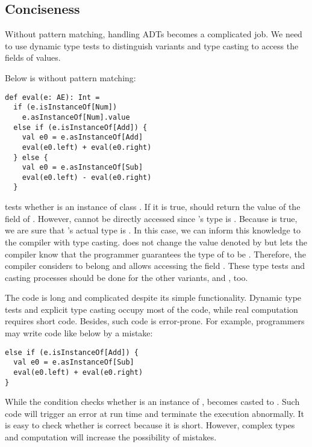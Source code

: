 \subsection{Conciseness}

Without pattern matching, handling ADTs becomes a complicated job. We need to
use dynamic type tests to distinguish variants and type casting to access the
fields of values.

Below is  without pattern matching:

\begin{verbatim}
def eval(e: AE): Int =
  if (e.isInstanceOf[Num])
    e.asInstanceOf[Num].value
  else if (e.isInstanceOf[Add]) {
    val e0 = e.asInstanceOf[Add]
    eval(e0.left) + eval(e0.right)
  } else {
    val e0 = e.asInstanceOf[Sub]
    eval(e0.left) - eval(e0.right)
  }
\end{verbatim}

 tests whether  is an instance of class
. If it is true,  should return the value of the field
 of . However,  cannot be directly accessed
since 's type is . Because  is true,
we are sure that 's actual type is . In this case, we can
inform this knowledge to the compiler with type casting. 
does not change the value denoted by  but lets the compiler know that
the programmer guarantees the type of  to be . Therefore, the
compiler considers  to belong  and allows
accessing the field . These type tests and casting processes should
be done for the other variants,  and , too.

The code is long and complicated despite its simple functionality. Dynamic type
tests and explicit type casting occupy most of the code, while real
computation requires short code. Besides, such code is error-prone.
For example, programmers may write code like below by a mistake:

\begin{verbatim}
else if (e.isInstanceOf[Add]) {
  val e0 = e.asInstanceOf[Sub]
  eval(e0.left) + eval(e0.right)
}
\end{verbatim}

While the condition checks whether  is an instance of ,
 becomes casted to . Such code will trigger an error at run
time and terminate the execution abnormally.
It is easy to check whether  is correct because it is short.
However, complex types and computation will increase the possibility of
mistakes.

